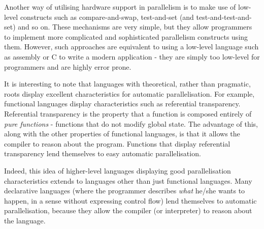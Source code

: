 Another way of utilising hardware support in parallelism is to make use of low-level constructs such as compare-and-swap, test-and-set (and test-and-test-and-set) and so on. These mechanisms are very simple, but they allow programmers to implement more complicated and sophisticated parallelism constructs using them. However, such approaches are equivalent to using a low-level language such as assembly or C to write a modern application - they are simply too low-level for programmers and are highly error prone.

It is interesting to note that languages with theoretical, rather than pragmatic, roots display excellent characteristics for automatic parallelisation. For example, functional languages display characteristics such as referential transparency. Referential transparency is the property that a function is composed entirely of \textit{pure functions} - functions that do not modify global state. The advantage of this, along with the other properties of functional languages, is that it allows the compiler to reason about the program. Functions that display referential transparency lend themselves to easy automatic parallelisation.

Indeed, this idea of higher-level languages displaying good parallelisation characteristics extends to languages other than just functional languages. Many declarative languages (where the programmer describes \emph{what} he/she wants to happen, in a sense without expressing control flow) lend themselves to automatic parallelisation, because they allow the compiler (or interpreter) to reason about the language.

